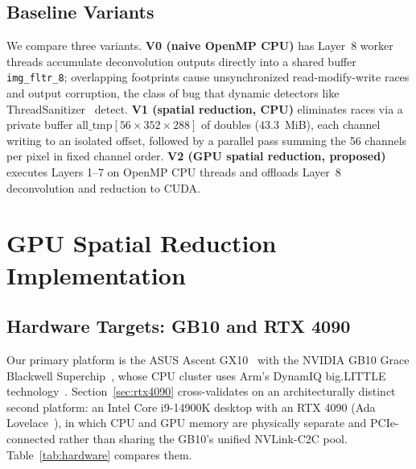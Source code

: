 \documentclass[conference]{IEEEtran}
\begin{document}
\subsection{Baseline Variants}
We compare three variants. \textbf{V0 (naive OpenMP CPU)} has Layer~8 worker threads accumulate deconvolution outputs directly into a shared buffer \texttt{img\_fltr\_8}; overlapping footprints cause unsynchronized read-modify-write races and output corruption, the class of bug that dynamic detectors like ThreadSanitizer~\cite{serebryany2009threadsanitizer} detect. \textbf{V1 (spatial reduction, CPU)} eliminates races via a private buffer $\text{all\_tmp}[56 \times 352 \times 288]$ of doubles ($43.3$~MiB), each channel writing to an isolated offset, followed by a parallel pass summing the 56 channels per pixel in fixed channel order. \textbf{V2 (GPU spatial reduction, proposed)} executes Layers 1--7 on OpenMP CPU threads and offloads Layer~8 deconvolution and reduction to CUDA.

\section{GPU Spatial Reduction Implementation}

\subsection{Hardware Targets: GB10 and RTX 4090}
Our primary platform is the ASUS Ascent GX10~\cite{asusgx10_datasheet} with the NVIDIA GB10 Grace Blackwell Superchip~\cite{nvidiagb10_2025}, whose CPU cluster uses Arm's DynamIQ big.LITTLE technology~\cite{armdynamiq}. Section~\ref{sec:rtx4090} cross-validates on an architecturally distinct second platform: an Intel Core i9-14900K desktop with an RTX 4090 (Ada Lovelace~\cite{nvidiaada2022}), in which CPU and GPU memory are physically separate and PCIe-connected rather than sharing the GB10's unified NVLink-C2C pool. Table~\ref{tab:hardware} compares them.
\end{document}
